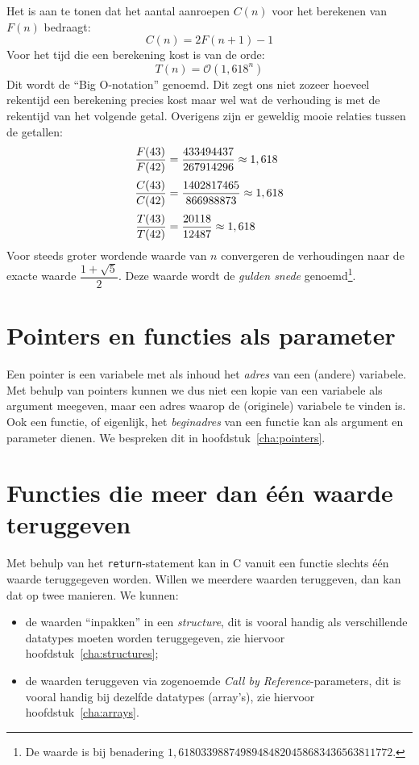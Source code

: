 Het is aan te tonen dat het aantal aanroepen $C(n)$ voor het berekenen van $F(n)$ bedraagt:
%
\begin{equation}
C(n) = 2F(n+1)-1
\end{equation}
%
Voor het tijd die een berekening kost is van de orde:
%
\begin{equation}
T(n) = \mathscr{O}(1,618^n)
\end{equation}
%
Dit wordt de ``Big O-notation'' genoemd. Dit zegt ons niet zozeer hoeveel rekentijd een berekening precies kost maar wel wat de verhouding is met de rekentijd van het volgende getal. Overigens zijn er geweldig mooie relaties tussen de getallen:
%
\begin{equation}
\jot=5pt
\begin{split}
\dfrac{F(43)}{F(42)} &= \dfrac{433494437}{267914296}\approx 1,618\\
\dfrac{C(43)}{C(42)} &= \dfrac{1402817465}{866988873}\approx 1,618\\
\dfrac{T(43)}{T(42)} &= \dfrac{20118}{12487}\approx 1,618
\end{split}\end{equation}
%
Voor steeds groter wordende waarde van $n$ convergeren de verhoudingen naar de exacte waarde $\dfrac{1+\sqrt{5}}{2}$. Deze waarde wordt de \textsl{gulden snede} genoemd\footnote{De waarde is bij benadering $1,61803398874989484820458683436563811772$.}.
\basic


\section{Pointers en functies als parameter}
Een pointer is een variabele met als inhoud het \textsl{adres} van een (andere) variabele. Met behulp van pointers kunnen we dus niet een kopie van een variabele als argument meegeven, maar een adres waarop de (originele) variabele te vinden is. Ook een functie, of eigenlijk, het \textsl{beginadres} van een functie kan als argument en parameter dienen. We bespreken dit in hoofdstuk~\ref{cha:pointers}.


\section{Functies die meer dan één waarde teruggeven}
Met behulp van het \texttt{return}-statement kan in C vanuit een functie slechts één waarde teruggegeven worden.
Willen we meerdere waarden teruggeven, dan kan dat op twee manieren. 
We kunnen:
\begin{itemize}
	\item
	de waarden ``inpakken'' in een \textsl{structure}, dit is vooral handig als verschillende datatypes moeten worden teruggegeven, zie hiervoor hoofdstuk~\ref{cha:structures};
	\item
	de waarden teruggeven via zogenoemde \emph{Call by Reference}-parameters, dit is vooral handig bij dezelfde datatypes (array's), zie hiervoor hoofdstuk~\ref{cha:arrays}.
\end{itemize}


